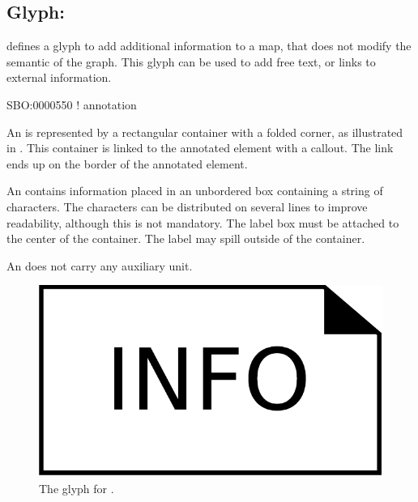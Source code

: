 
\subsection{Glyph: }
\label{sec:annotation}

\SBGNAFLone defines a glyph to add additional information to a map, that does not modify the semantic of the graph. This glyph can be used to add free text, or links to external information.

\begin{glyphDescription}

\glyphSboTerm SBO:0000550 ! annotation

\glyphContainer An  is represented by a rectangular container with a folded corner, as illustrated in . This container is linked to the annotated element with a callout. The link ends up on the border of the annotated element.

\glyphLabel An  contains information placed in an unbordered box containing a string of characters.  The characters can be distributed on several lines to improve readability, although this is not mandatory.  The label box must be attached to the center of the container. The label may spill outside of the container. 

\glyphAux An  does not carry any auxiliary unit.
\end{glyphDescription}

\begin{figure}[H]
  \centering
  \includegraphics[scale = 0.3]{images/build/annotation.pdf}
  \caption{The \AF glyph for .}
  \label{fig:annotation}
\end{figure}


